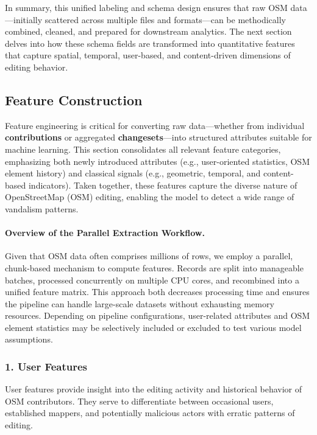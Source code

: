 \documentclass[
    13pt, %
    a4paper, %
    twoside, 
    DIV14, %
    listof=totoc, %
    bibliography=totoc, %
    index=totoc, %
    headsepline
]{scrreprt}
\begin{document}
In summary, this unified labeling and schema design ensures that raw OSM data—initially scattered across multiple files and formats—can be methodically combined, cleaned, and prepared for downstream analytics. The next section delves into how these schema fields are transformed into quantitative features that capture spatial, temporal, user-based, and content-driven dimensions of editing behavior.

\subsection{Feature Construction}
\label{sec:feature_construction}

Feature engineering is critical for converting raw data—whether from individual \textbf{contributions} or aggregated \textbf{changesets}—into structured attributes suitable for machine learning. This section consolidates all relevant feature categories, emphasizing both newly introduced attributes (e.g., user-oriented statistics, OSM element history) and classical signals (e.g., geometric, temporal, and content-based indicators). Taken together, these features capture the diverse nature of OpenStreetMap (OSM) editing, enabling the model to detect a wide range of vandalism patterns.

\paragraph{Overview of the Parallel Extraction Workflow.}
Given that OSM data often comprises millions of rows, we employ a parallel, chunk-based mechanism to compute features. Records are split into manageable batches, processed concurrently on multiple CPU cores, and recombined into a unified feature matrix. This approach both decreases processing time and ensures the pipeline can handle large-scale datasets without exhausting memory resources. Depending on pipeline configurations, user-related attributes and OSM element statistics may be selectively included or excluded to test various model assumptions.

\subsubsection*{1. User Features}
User features provide insight into the editing activity and historical behavior of OSM contributors. They serve to differentiate between occasional users, established mappers, and potentially malicious actors with erratic patterns of editing.
\end{document}

